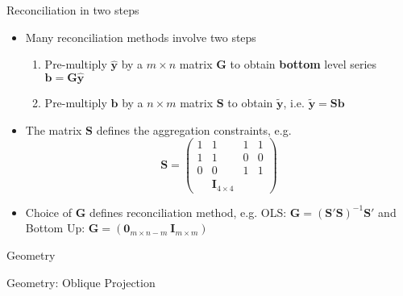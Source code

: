 \documentclass{beamer}
\begin{document}
  \begin{frame}{Reconciliation in two steps}
  	\begin{itemize}
  		\item Many reconciliation methods involve two steps
  		\begin{enumerate}
  			\item Pre-multiply $\hat{\bm y}$ by a $m\times n$ matrix $\bm G$ to obtain {\bf bottom} level series ${\bm b}={\bm G}{\hat{\bm y}}$ 
  			\item Pre-multiply ${\bm b}$ by a $n\times m$ matrix $\bm S$ to obtain ${\tilde{\bm y}}$, i.e. $\tilde{\bm y}={\bm S}{{\bm b}}$
  		\end{enumerate}
  	    \item The matrix ${\bm S}$ defines the aggregation constraints, e.g.
  	    \begin{equation*}
  	    {\bm S}=\begin{pmatrix} 1 &1 &1 &1 \\1 &1 &0 &0 \\0 &0 &1 &1 \\ &{\bm I_{4\times 4}}
  	    \end{pmatrix}
  	    \end{equation*}
  	    \item Choice of ${\bm G}$ defines reconciliation method, e.g. OLS: ${\bm G}=\left(\bm{S}'\bm{S}\right)^{-1}{\bm S'}$ and Bottom Up: ${\bm G}=\left(\bm{0}_{m\times n-m}~\bm{I}_{m\times m}\right)$ 
    \end{itemize}
  \end{frame}
  \begin{frame}{Geometry}
  	\vspace{-2.3cm}
  	\centering
  	
  \end{frame}
  \begin{frame}{Geometry: Oblique Projection}
  	\vspace{-0.9cm}
  	\centering
  	
  \end{frame}
\end{document}
